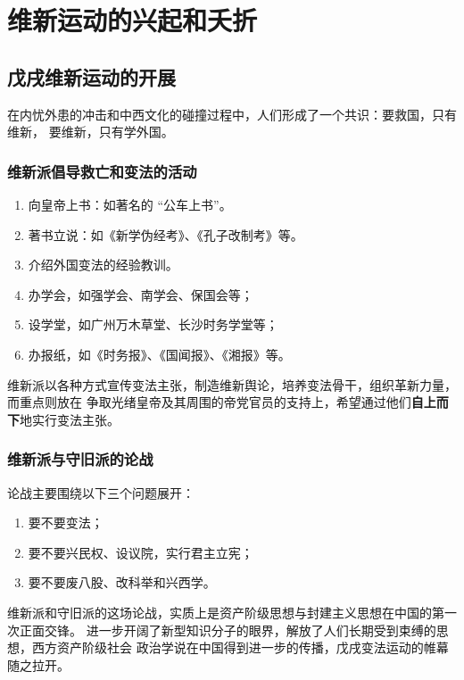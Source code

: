 \documentclass[10pt, UTF8]{book} %
\begin{document}
\section{维新运动的兴起和夭折}

\subsection{戊戌维新运动的开展}

在内忧外患的冲击和中西文化的碰撞过程中，人们形成了一个共识：要救国，只有维新，
要维新，只有学外国。

\subsubsection{维新派倡导救亡和变法的活动}

\begin{enumerate}[label=(\arabic*), itemsep=0pt]
    \item 向皇帝上书：如著名的 “公车上书”。
    \item 著书立说：如《新学伪经考》、《孔子改制考》等。
    \item 介绍外国变法的经验教训。
    \item 办学会，如强学会、南学会、保国会等；
    \item 设学堂，如广州万木草堂、长沙时务学堂等；
    \item 办报纸，如《时务报》、《国闻报》、《湘报》等。
\end{enumerate}
维新派以各种方式宣传变法主张，制造维新舆论，培养变法骨干，组织革新力量，而重点则放在
争取光绪皇帝及其周围的帝党官员的支持上，希望通过他们\textbf{自上而下}地实行变法主张。

\subsubsection{维新派与守旧派的论战}

论战主要围绕以下三个问题展开：
\begin{enumerate}[label=(\arabic*), itemsep=0pt]
    \item 要不要变法；
    \item 要不要兴民权、设议院，实行君主立宪；
    \item 要不要废八股、改科举和兴西学。
\end{enumerate}
维新派和守旧派的这场论战，实质上是资产阶级思想与封建主义思想在中国的第一次正面交锋。
进一步开阔了新型知识分子的眼界，解放了人们长期受到束缚的思想，西方资产阶级社会
政治学说在中国得到进一步的传播，戊戌变法运动的帷幕随之拉开。
\end{document}
